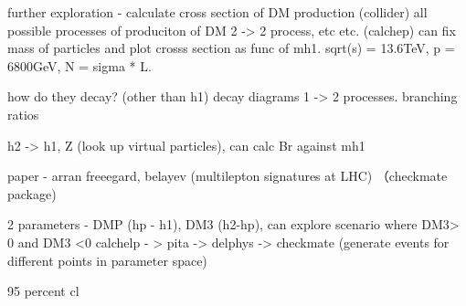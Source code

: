 \documentclass[11pt,a4paper]{article}
\begin{document}
further exploration - calculate cross section of DM production (collider)
all possible processes of produciton of DM 2 -> 2 process, etc etc. (calchep)
can fix mass of particles and plot crosss section as func of mh1.
sqrt(s) = 13.6TeV, p = 6800GeV, N = sigma * L. 

how do they decay? (other than h1)
decay diagrams 1 -> 2 processes.
branching ratios

h2 -> h1, Z (look up virtual particles), can calc Br against mh1

paper - arran freeegard, belayev (multilepton signatures at LHC) （checkmate package)

2 parameters - DMP (hp - h1), DM3 (h2-hp), can explore scenario where DM3> 0 and DM3 <0
calchelp - > pita -> delphys -> checkmate (generate events for different points in parameter space)

95 percent cl
\end{document}
